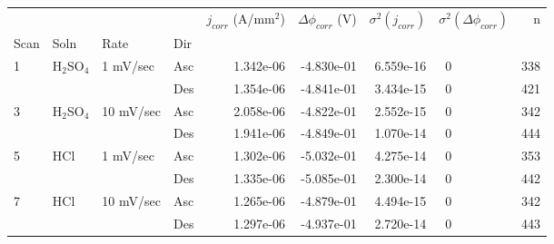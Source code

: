 \begin{tabular}{llllrrrlr}
\toprule
  &     &           &     &  $j_{corr}$ (A/mm$^2$) &  $\Delta \phi_{corr}$ (V) &  $\sigma^2(j_{corr})$ & $\sigma^2(\Delta \phi_{corr})$ &    n \\
Scan & Soln & Rate & Dir &                        &                           &                       &                                &      \\
\midrule
1 & H$_2$SO$_4$ & 1 mV/sec & Asc &              1.342e-06 &                -4.830e-01 &             6.559e-16 &                             ~0 &  338 \\
  &     &           & Des &              1.354e-06 &                -4.841e-01 &             3.434e-15 &                             ~0 &  421 \\
3 & H$_2$SO$_4$ & 10 mV/sec & Asc &              2.058e-06 &                -4.822e-01 &             2.552e-15 &                             ~0 &  342 \\
  &     &           & Des &              1.941e-06 &                -4.849e-01 &             1.070e-14 &                             ~0 &  444 \\
5 & HCl & 1 mV/sec & Asc &              1.302e-06 &                -5.032e-01 &             4.275e-14 &                             ~0 &  353 \\
  &     &           & Des &              1.335e-06 &                -5.085e-01 &             2.300e-14 &                             ~0 &  442 \\
7 & HCl & 10 mV/sec & Asc &              1.265e-06 &                -4.879e-01 &             4.494e-15 &                             ~0 &  342 \\
  &     &           & Des &              1.297e-06 &                -4.937e-01 &             2.720e-14 &                             ~0 &  443 \\
\bottomrule
\end{tabular}
